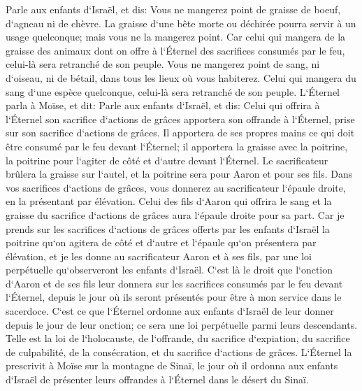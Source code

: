\verse Parle aux enfants d`Israël, et dis: Vous ne mangerez point de graisse de boeuf, d`agneau ni de chèvre. 
\verse La graisse d`une bête morte ou déchirée pourra servir à un usage quelconque; mais vous ne la mangerez point. 
\verse Car celui qui mangera de la graisse des animaux dont on offre à l`Éternel des sacrifices consumés par le feu, celui-là sera retranché de son peuple. 
\verse Vous ne mangerez point de sang, ni d`oiseau, ni de bétail, dans tous les lieux où vous habiterez. 
\verse Celui qui mangera du sang d`une espèce quelconque, celui-là sera retranché de son peuple. 
\verse L`Éternel parla à Moïse, et dit: 
\verse Parle aux enfants d`Israël, et dis: Celui qui offrira à l`Éternel son sacrifice d`actions de grâces apportera son offrande à l`Éternel, prise sur son sacrifice d`actions de grâces. 
\verse Il apportera de ses propres mains ce qui doit être consumé par le feu devant l`Éternel; il apportera la graisse avec la poitrine, la poitrine pour l`agiter de côté et d`autre devant l`Éternel. 
\verse Le sacrificateur brûlera la graisse sur l`autel, et la poitrine sera pour Aaron et pour ses fils. 
\verse Dans vos sacrifices d`actions de grâces, vous donnerez au sacrificateur l`épaule droite, en la présentant par élévation. 
\verse Celui des fils d`Aaron qui offrira le sang et la graisse du sacrifice d`actions de grâces aura l`épaule droite pour sa part. 
\verse Car je prends sur les sacrifices d`actions de grâces offerts par les enfants d`Israël la poitrine qu`on agitera de côté et d`autre et l`épaule qu`on présentera par élévation, et je les donne au sacrificateur Aaron et à ses fils, par une loi perpétuelle qu`observeront les enfants d`Israël. 
\verse C`est là le droit que l`onction d`Aaron et de ses fils leur donnera sur les sacrifices consumés par le feu devant l`Éternel, depuis le jour où ils seront présentés pour être à mon service dans le sacerdoce. 
\verse C`est ce que l`Éternel ordonne aux enfants d`Israël de leur donner depuis le jour de leur onction; ce sera une loi perpétuelle parmi leurs descendants. 
\verse Telle est la loi de l`holocauste, de l`offrande, du sacrifice d`expiation, du sacrifice de culpabilité, de la consécration, et du sacrifice d`actions de grâces. 
\verse L`Éternel la prescrivit à Moïse sur la montagne de Sinaï, le jour où il ordonna aux enfants d`Israël de présenter leurs offrandes à l`Éternel dans le désert du Sinaï. 

